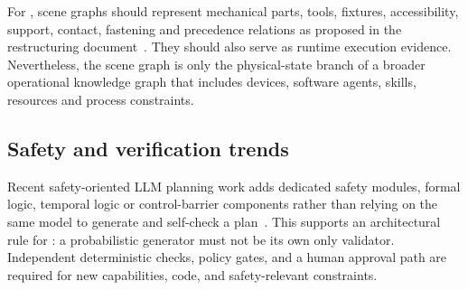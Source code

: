\documentclass{plan4ari_report}
\begin{document}
For \PlanARI, scene graphs should represent mechanical parts, tools, fixtures, accessibility, support, contact, fastening and precedence relations as proposed in the restructuring document~\cite{sandrini2026proposal}. They should also serve as runtime execution evidence. Nevertheless, the scene graph is only the physical-state branch of a broader operational knowledge graph that includes devices, software agents, skills, resources and process constraints.

\subsection{Safety and verification trends}
Recent safety-oriented LLM planning work adds dedicated safety modules, formal logic, temporal logic or control-barrier components rather than relying on the same model to generate and self-check a plan~\cite{li2025safeplanner,wu2025selp,obi2025safeplan}. This supports an architectural rule for \PlanARI: a probabilistic generator must not be its own only validator. Independent deterministic checks, policy gates, and a human approval path are required for new capabilities, code, and safety-relevant constraints.
\end{document}
